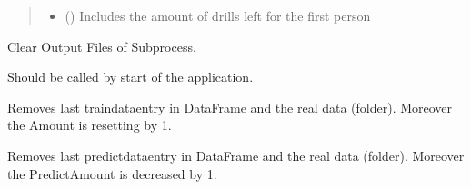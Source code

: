 \documentclass[letterpaper,10pt,english]{sphinxmanual}
\begin{document}
\begin{fulllineitems}
\begin{fulllineitems}
\begin{quote}
\begin{description}
\begin{itemize}
\item {} 
\sphinxAtStartPar
{} () \textendash{} Includes the amount of drills left for the first person

\end{itemize}

\end{description}\end{quote}

\end{fulllineitems}


\begin{fulllineitems}
\label{\detokenize{anoog.automation:anoog.automation.controller.Terminal.clean_output}}
\sphinxAtStartPar
Clear Output Files of Subprocess.

\sphinxAtStartPar
Should be called by start of the application.

\end{fulllineitems}


\begin{fulllineitems}
\label{\detokenize{anoog.automation:anoog.automation.controller.Terminal.delete_last}}
\sphinxAtStartPar
Removes last train\sphinxhyphen{}data\sphinxhyphen{}entry in DataFrame and the real data (folder).
Moreover the Amount is resetting by 1.

\end{fulllineitems}


\begin{fulllineitems}
\label{\detokenize{anoog.automation:anoog.automation.controller.Terminal.delete_last_predict_drill}}
\sphinxAtStartPar
Removes last predict\sphinxhyphen{}data\sphinxhyphen{}entry in DataFrame and the real data (folder).
Moreover the Predict\sphinxhyphen{}Amount is decreased by 1.


\end{fulllineitems}
\end{fulllineitems}
\end{document}
